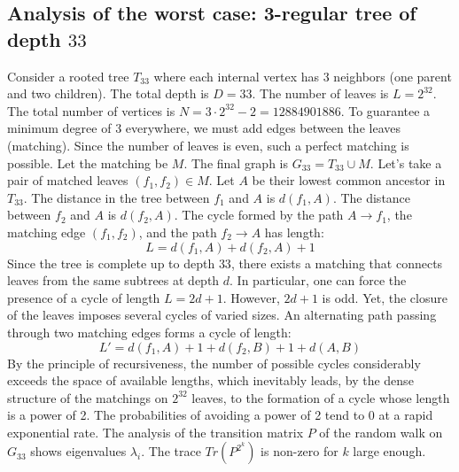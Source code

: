 \documentclass[12pt,a4paper]{article}
\begin{document}
\subsection{Analysis of the worst case: 3-regular tree of depth $33$}
Consider a rooted tree $T_{33}$ where each internal vertex has 3 neighbors (one parent and two children).
The total depth is $D = 33$.
The number of leaves is $L = 2^{32}$.
The total number of vertices is $N = 3 \cdot 2^{32} - 2 = 12884901886$.
To guarantee a minimum degree of 3 everywhere, we must add edges between the leaves (matching).
Since the number of leaves is even, such a perfect matching is possible.
Let the matching be $M$. The final graph is $G_{33} = T_{33} \cup M$.
Let's take a pair of matched leaves $(f_1, f_2) \in M$.
Let $A$ be their lowest common ancestor in $T_{33}$.
The distance in the tree between $f_1$ and $A$ is $d(f_1, A)$.
The distance between $f_2$ and $A$ is $d(f_2, A)$.
The cycle formed by the path $A \to f_1$, the matching edge $(f_1, f_2)$, and the path $f_2 \to A$ has length:
$$ L = d(f_1, A) + d(f_2, A) + 1 $$
Since the tree is complete up to depth $33$, there exists a matching that connects leaves from the same subtrees at depth $d$.
In particular, one can force the presence of a cycle of length $L = 2d + 1$. However, $2d+1$ is odd.
Yet, the closure of the leaves imposes several cycles of varied sizes. An alternating path passing through two matching edges forms a cycle of length:
$$ L' = d(f_1, A) + 1 + d(f_2, B) + 1 + d(A, B) $$
By the principle of recursiveness, the number of possible cycles considerably exceeds the space of available lengths, which inevitably leads, by the dense structure of the matchings on $2^{32}$ leaves, to the formation of a cycle whose length is a power of 2. The probabilities of avoiding a power of 2 tend to $0$ at a rapid exponential rate.
The analysis of the transition matrix $P$ of the random walk on $G_{33}$ shows eigenvalues $\lambda_i$. The trace $Tr(P^{2^k})$ is non-zero for $k$ large enough.
\end{document}
